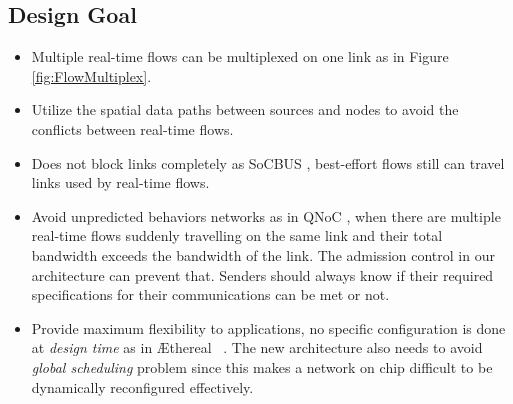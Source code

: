 \documentclass[conference, twocolumn]{IEEEtran}
\theoremstyle{definition}
\begin{document}
\subsection{Design Goal}
\begin{itemize}
\item Multiple real-time flows can be multiplexed on one link
\cite{Ferrari90ascheme} as in Figure \ref{fig:FlowMultiplex}.
\item Utilize the spatial data paths between sources and nodes to avoid the 
conflicts between real-time flows.
\item Does not block links completely as SoCBUS \cite{SoCBUS}, best-effort flows 
still can travel links used by real-time flows.
\item Avoid unpredicted behaviors networks as in QNoC \cite{QNoC}, when there are 
multiple real-time flows suddenly travelling on the same link and their total bandwidth 
exceeds the bandwidth of the link. The admission control in our architecture can 
prevent that. Senders should always know if their required specifications for 
their communications can be met or not. 
\item Provide maximum flexibility to applications, no specific configuration
is done at {\em design time} as in \AE thereal ~\cite{Moonen07SPRINGER}. The
new architecture also needs to avoid {\em global scheduling} problem since this
makes a network on chip difficult to be dynamically reconfigured effectively.
\end{itemize}
\end{document}
